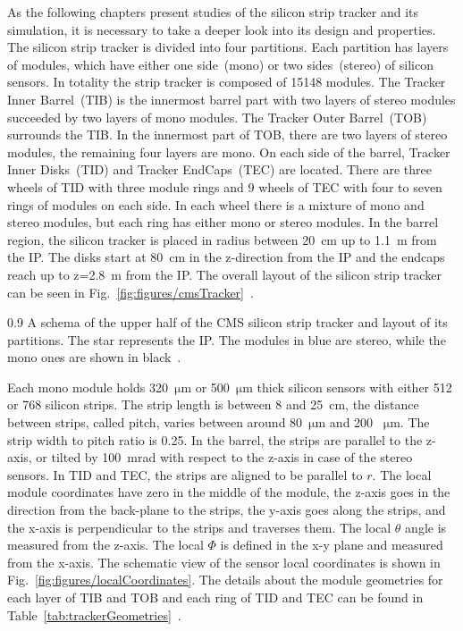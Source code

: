 As the following chapters present studies of the silicon strip tracker and its simulation, it is necessary to take a deeper look into its design and properties. The silicon strip tracker is divided into four partitions. Each partition has layers of modules, which have either one side~(mono) or two sides~(stereo) of silicon sensors. In totality the strip tracker is composed of 15148 modules. The Tracker Inner Barrel~(TIB) is the innermost barrel part with two layers of stereo modules succeeded by two layers of mono modules. The Tracker Outer Barrel~(TOB) surrounds the TIB. In the innermost part of TOB, there are two layers of stereo modules, the remaining four layers are mono. On each side of the barrel, Tracker Inner Disks~(TID) and Tracker EndCaps~(TEC) are located. There are three wheels of TID with three module rings and 9 wheels of TEC with four to seven rings of modules on each side. In each wheel there is a mixture of mono and stereo modules, but each ring has either mono or stereo modules. In the barrel region, the silicon tracker is placed in radius between 20~cm up to 1.1~m from the IP. The disks start at 80~cm in the z-direction from the IP and the endcaps reach up to z=2.8~m from the IP. The overall layout of the silicon strip tracker can be seen in Fig.~\ref{fig:figures/cmsTracker}~\cite{Chatrchyan:2014fea}.

                 {0.9}       
                 {A schema of the upper half of the CMS silicon strip tracker and layout of its partitions. The star represents the IP. The modules in blue are stereo, while the mono ones are shown in black~\cite{Chatrchyan:2014fea}. }

Each mono module holds 320~$\mathrm{\mu m}$ or 500~$\mathrm{\mu m}$ thick silicon sensors with either 512 or 768 silicon strips.  The strip length is between 8 and 25~cm, the distance between strips, called pitch, varies between around 80~$\mathrm{\mu m}$ and 200 ~$\mathrm{\mu m}$. The strip width to pitch ratio is 0.25. In the barrel, the strips are parallel to the z-axis, or tilted by 100~mrad with respect to the z-axis in case of the stereo sensors. In TID and TEC, the strips are aligned to be parallel to $r$. The local module coordinates have zero in the middle of the module, the z-axis goes in the direction from the back-plane to the strips, the y-axis goes along the strips, and the x-axis is perpendicular to the strips and traverses them. The local $\theta$ angle is measured from the z-axis. The local $\Phi$ is defined in the x-y plane and measured from the x-axis. The schematic view of the sensor local coordinates is shown in Fig.~\ref{fig:figures/localCoordinates}. The details about the module geometries for each layer of TIB and TOB and each ring of TID and TEC can be found in Table~\ref{tab:trackerGeometries}~\cite{website:hephyPage}.



